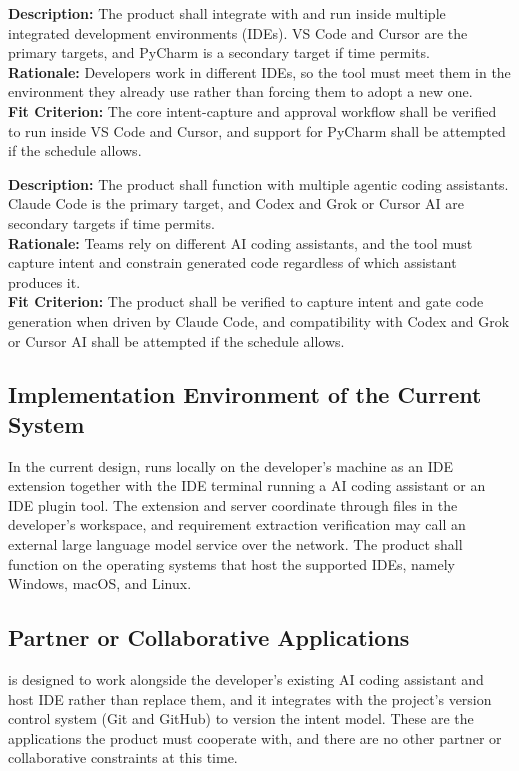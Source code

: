\documentclass[12pt]{article}
\begin{document}
\medskip
\noindent\textbf{Description:} The product shall integrate with and run inside
multiple integrated development environments (IDEs). VS Code and Cursor are the
primary targets, and PyCharm is a secondary target if time permits. \\
\textbf{Rationale:} Developers work in different IDEs, so the tool must meet them
in the environment they already use rather than forcing them to adopt a new one. \\
\textbf{Fit Criterion:} The core intent-capture and approval workflow shall be
verified to run inside VS Code and Cursor, and support for PyCharm shall be
attempted if the schedule allows.

\medskip
\noindent\textbf{Description:} The product shall function with multiple agentic
coding assistants. Claude Code is the primary target, and Codex and Grok or
Cursor AI are secondary targets if time permits. \\
\textbf{Rationale:} Teams rely on different AI coding assistants, and the tool
must capture intent and constrain generated code regardless of which assistant
produces it. \\
\textbf{Fit Criterion:} The product shall be verified to capture intent and gate
code generation when driven by Claude Code, and compatibility with Codex and
Grok or Cursor AI shall be attempted if the schedule allows.

\subsection{Implementation Environment of the Current System}

In the current design, \progname{} runs locally on the developer's machine as an
IDE extension together with the IDE terminal running a AI coding assistant or 
an IDE plugin tool. The extension and server coordinate through
files in the developer's workspace, and requirement extraction verification may call an
external large language model service over the network. The product shall
function on the operating systems that host the supported IDEs, namely Windows,
macOS, and Linux.

\subsection{Partner or Collaborative Applications}

\progname{} is designed to work alongside the developer's existing AI coding
assistant and host IDE rather than replace them, and it integrates with the
project's version control system (Git and GitHub) to version the intent model.
These are the applications the product must cooperate with, and there are no
other partner or collaborative constraints at this time.
\end{document}
